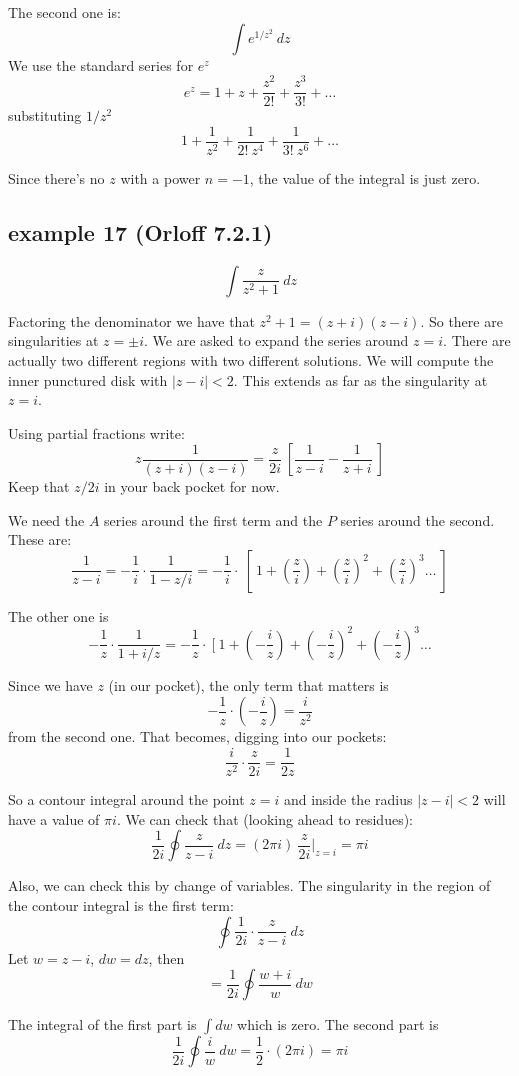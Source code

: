 \documentclass[11pt, oneside]{article}
\begin{document}
\label{sec:ex19L}

The second one is:
\[ \int e^{1/z^2} \ dz \]
We use the standard series for $e^z$
\[ e^z = 1 + z + \frac{z^2}{2!} + \frac{z^3}{3!} + \dots \]
substituting $1/z^2$
\[ 1 + \frac{1}{z^2} + \frac{1}{2! \ z^4} + \frac{1}{3! \ z^6} + \dots \]

Since there's no $z$ with a power $n=-1$, the value of the integral is just zero.

\subsection*{example 17 (Orloff 7.2.1)}

\label{sec:ex17L}

\[ \int \frac{z}{z^2 + 1} \ dz \]

Factoring the denominator we have that $z^2 + 1 = (z + i)(z - i)$.  So there are singularities at $z = \pm i$.  We are asked to expand the series around $z =i$.  There are actually two different regions with two different solutions.  We will compute the inner punctured disk with $|z - i| < 2$.  This extends as far as the singularity at $z = i$.

Using partial fractions write:
\[ z \frac{1}{(z + i)(z - i)} = \frac{z}{2i} \ [ \frac{1}{z - i} - \frac{1}{z + i}  \  ] \]
Keep that $z/2i$ in your back pocket for now.

We need the $A$ series around the first term and the $P$ series around the second.  These are:
\[ \frac{1}{z - i} = - \frac{1}{i} \cdot \frac{1}{1 - z/i} = - \frac{1}{i} \cdot \ [ \ 1 + (\frac{z}{i}) + (\frac{z}{i})^2 + (\frac{z}{i})^3 \dots \ ] \]

The other one is
\[ - \frac{1}{z} \cdot \frac{1}{1 + i/z} = - \frac{1}{z} \cdot \ [ \ 1 + (-\frac{i}{z}) + (-\frac{i}{z})^2 + (-\frac{i}{z})^3 \dots \]

Since we have $z$ (in our pocket), the only term that matters is
\[ -\frac{1}{z} \cdot (- \frac{i}{z}) = \frac{i}{z^2} \]
from the second one.  That becomes, digging into our pockets:
\[ \frac{i}{z^2} \cdot \frac{z}{2i} = \frac{1}{2z} \]

So a contour integral around the point $z = i$ and inside the radius $|z - i| < 2$ will have a value of $\pi i$.  We can check that (looking ahead to residues):
\[ \frac{1}{2i}  \oint \frac{z}{z - i} \ dz = (2 \pi i) \ \frac{z}{2 i} \bigg |_{z = i} = \pi i \]

Also, we can check this by change of variables.  The singularity in the region of the contour integral is the first term:
\[ \oint \frac{1}{2i} \cdot \frac{z}{z - i} \ dz \]
Let $w = z - i$, $dw = dz$, then
\[ = \frac{1}{2i} \oint \frac{w + i}{w} \ dw \]

The integral of the first part is $\int dw$ which is zero.  The second part is
\[ \frac{1}{2i} \oint \frac{i}{w} \ dw = \frac{1}{2} \cdot (2 \pi i) = \pi i \]
\end{document}
